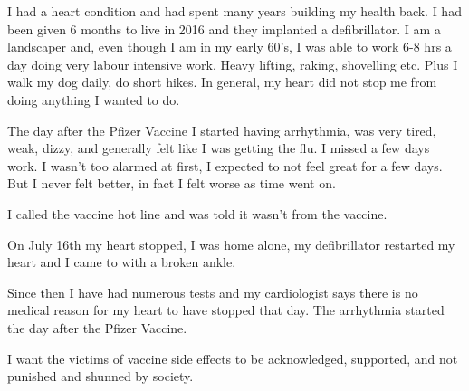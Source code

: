 I had a heart condition and had spent many years building my health back. I had
been given 6 months to live in 2016 and they implanted a defibrillator. I am a
landscaper and, even though I am in my early 60’s, I was able to work 6-8 hrs a
day doing very labour intensive work. Heavy lifting, raking, shovelling
etc. Plus I walk my dog daily, do short hikes. In general, my heart did not stop
me from doing anything I wanted to do.

The day after the Pfizer Vaccine I started having arrhythmia, was very tired,
weak, dizzy, and generally felt like I was getting the flu. I missed a few days
work. I wasn’t too alarmed at first, I expected to not feel great for a few
days. But I never felt better, in fact I felt worse as time went on.

I called the vaccine hot line and was told it wasn’t from the vaccine.

On July 16th my heart stopped, I was home alone, my defibrillator restarted my
heart and I came to with a broken ankle.

Since then I have had numerous tests and my cardiologist says there is no
medical reason for my heart to have stopped that day. The arrhythmia started the
day after the Pfizer Vaccine.

I want the victims of vaccine side effects to be acknowledged, supported, and
not punished and shunned by society.
